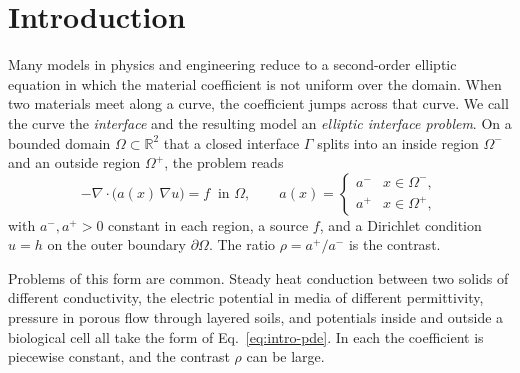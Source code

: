 \documentclass[pdflatex,sn-mathphys-num]{sn-jnl}%
\theoremstyle{thmstyleone}%
\theoremstyle{thmstyletwo}%
\theoremstyle{thmstylethree}%
\begin{document}


\maketitle

\section{Introduction}\label{sec:intro}

Many models in physics and engineering reduce to a second-order elliptic equation in which the material coefficient is not uniform over the domain. When two materials meet along a curve, the coefficient jumps across that curve. We call the curve the \emph{interface} and the resulting model an \emph{elliptic interface problem}. On a bounded domain $\Omega\subset\mathbb{R}^2$ that a closed interface $\Gamma$ splits into an inside region $\Omega^-$ and an outside region $\Omega^+$, the problem reads
\begin{equation}
-\nabla\!\cdot\!\big(a(x)\,\nabla u\big)=f \ \text{ in }\Omega,
\qquad
a(x)=\begin{cases} a^- & x\in\Omega^-,\\[2pt] a^+ & x\in\Omega^+,\end{cases}
\label{eq:intro-pde}
\end{equation}
with $a^-,a^+>0$ constant in each region, a source $f$, and a Dirichlet condition $u=h$ on the outer boundary $\partial\Omega$. The ratio $\rho=a^+/a^-$ is the contrast.

Problems of this form are common. Steady heat conduction between two solids of different conductivity, the electric potential in media of different permittivity, pressure in porous flow through layered soils, and potentials inside and outside a biological cell all take the form of Eq.~\eqref{eq:intro-pde}. In each the coefficient is piecewise constant, and the contrast $\rho$ can be large.
\end{document}
